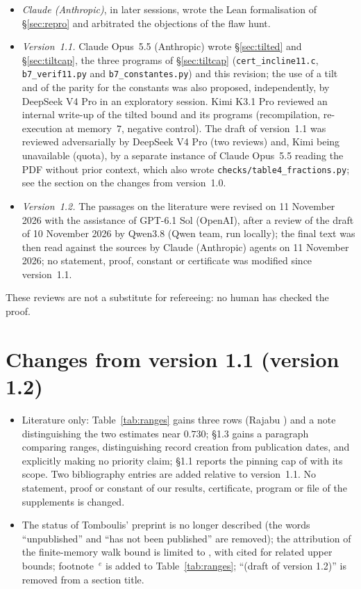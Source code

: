 \documentclass[11pt,a4paper]{article}
\theoremstyle{plain}
\theoremstyle{remark}
\numberwithin{equation}{section}
\begin{document}
\begin{itemize}
(Corollary~\ref{cor:tension}) and the remark on the range of $R$ (Remark~\ref{rem:table}).
\item \emph{Claude (Anthropic)}, in later sessions, wrote the Lean formalisation of \S\ref{sec:repro} and arbitrated the objections of
the flaw hunt.
\item \emph{Version~1.1.} Claude Opus~5.5 (Anthropic) wrote \S\ref{sec:tilted} and \S\ref{sec:tiltcap}, the three programs of
\S\ref{sec:tiltcap} (\texttt{cert\_incline11.c}, \texttt{b7\_verif11.py} and \texttt{b7\_constantes.py}) and this revision; the use of a tilt and of the
parity for the constants was also proposed, independently, by DeepSeek V4 Pro in an exploratory session. Kimi K3.1 Pro reviewed an
internal write-up of the tilted bound and its programs (recompilation, re-execution at memory~$7$, negative control). The draft of
version~1.1 was reviewed adversarially by DeepSeek V4 Pro (two reviews) and, Kimi being unavailable (quota), by a separate instance
of Claude Opus~5.5 reading the PDF without prior context, which also wrote \texttt{checks/table4\_fractions.py}; see the section on
the changes from version~1.0.
\item \emph{Version~1.2.} The passages on the literature were revised on 11 November 2026 with the assistance of GPT-6.1 Sol (OpenAI), after a review of the draft of 10 November 2026 by Qwen3.8 (Qwen team, run locally); the final text was then read against the sources by Claude (Anthropic) agents on 11 November 2026; no statement, proof, constant or certificate was modified since version~1.1.
\end{itemize}
These reviews are not a substitute for refereeing: no human has checked the proof.

\section*{Changes from version 1.1 (version 1.2)}
\begin{itemize}
\item Literature only: Table~\ref{tab:ranges} gains three rows (Rajabu \cite{Raj26a,Raj26b}) and a note distinguishing the two estimates near $0.730$; \S1.3 gains a paragraph comparing ranges, distinguishing record creation from publication dates, and explicitly making no priority claim; \S1.1 reports the pinning cap of \cite[Prop.~7.1, second preprint]{Raj26b} with its scope. Two bibliography entries are added relative to version~1.1. No statement, proof or constant of our results, certificate, program or file of the supplements is changed.
\item The status of Tomboulis' preprint is no longer described (the words ``unpublished'' and ``has not been published'' are removed); the attribution of the finite-memory walk bound is limited to \cite{PT00}, with \cite{Alm93} cited for related upper bounds; footnote~$^e$ is added to Table~\ref{tab:ranges}; ``(draft of version 1.2)'' is removed from a section title.
\end{itemize}
\end{document}
